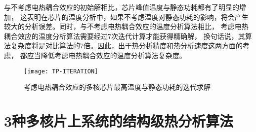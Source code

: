 与不考虑电热耦合效应的初始解相比，芯片峰值温度与静态功耗都有了明显的增加， 这表明在芯片的温度分析中，如果不考虑温度对静态功耗的影响，将会产生较大的分析误差。同时，与不考虑电热耦合效应的温度分析算法相比， 考虑电热耦合效应的温度分析算法需要经过7次迭代计算才能获得精确解， 换句话说，其算法复杂度将是对比算法的7倍。因此，出于热分析精度和热分析速度这两方面的考虑， 都应当降低考虑电热耦合效应的温度分析算法复杂度。
\begin{figure}[H]
  \centering
  \texttt{[image: TP-ITERATION]}
  \caption{考虑电热耦合效应的多核芯片最高温度与静态功耗的迭代求解}
  \label{fig:tp-iteration}
\end{figure}


\section{3种多核片上系统的结构级热分析算法}
\label{sec:SSTAmethod}

